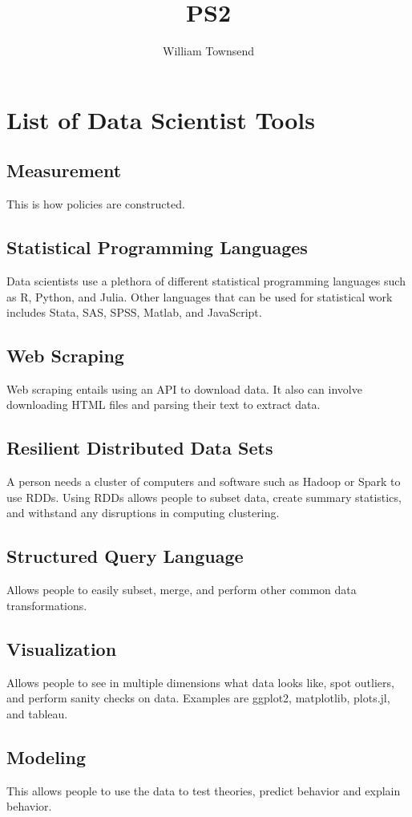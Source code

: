 \documentclass{article}
\title{PS2}
\author{William Townsend}
\begin{document}
\maketitle



\section{List of Data Scientist Tools}

\subsection{Measurement}

This is how policies are constructed.

\subsection{Statistical Programming Languages}

Data scientists use a plethora of different statistical programming languages such as R, Python, and Julia. Other languages that can be used for statistical work includes Stata, SAS, SPSS, Matlab, and JavaScript.

\subsection{Web Scraping}

Web scraping entails using an API to download data. It also can involve downloading HTML files and parsing their text to extract data.

\subsection{Resilient Distributed Data Sets}

A person needs a cluster of computers and software such as Hadoop or Spark to use RDDs. Using RDDs allows people to subset data, create summary statistics, and withstand any disruptions in computing clustering. 

\subsection{Structured Query Language}

Allows people to easily subset, merge, and perform other common data transformations.

\subsection{Visualization}

Allows people to see in multiple dimensions what data looks like, spot outliers, and perform sanity checks on data. Examples are ggplot2, matplotlib, plots.jl, and tableau.

\subsection{Modeling}
This allows people to use the data to test theories, predict behavior and explain behavior.
\end{document}
